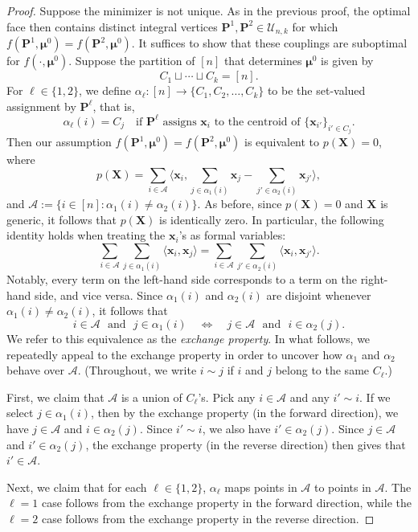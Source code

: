 \documentclass[10pt,a4paper]{amsart}
\newcommand{\bUnk}{\mathcal{U}_{n,k}}
\newcommand{\la}{\big\langle}
\newcommand{\ra}{\big\rangle}
\newcommand{\bmu}{\bm{\mu}}
\newcommand{\cA}{\mathcal{A}}
\theoremstyle{plain}
\theoremstyle{definition}
\begin{document}
\begin{proof}
Suppose the minimizer is not unique.  As in the previous proof, the optimal face then contains distinct integral vertices $\bm{P}^1,\bm{P}^2\in\bUnk$ for which $f(\bm{P}^1,\bmu^0)=f(\bm{P}^2,\bmu^0)$.  It suffices to show that these couplings are suboptimal for $f(\cdot,\bmu^0)$.
Suppose the partition of $[n]$ that determines $\bmu^0$ is given by 
\[
C_1\sqcup \cdots \sqcup C_k 
= [n].
\]
For $\ell\in \{1,2 \}$, we define $\alpha_\ell\colon [n]\to \{ C_1, C_2,\dotsc, C_k\}$ to be the set-valued assignment by $\bm{P}^\ell$, that is,
\[
\alpha_\ell(i) 
= C_j\quad \text{if $\bm{P}^\ell$ assigns $\bm{x}_i$ to the centroid of $\{\bm{x}_{i'}\}_{i'\in C_j}$}.
\] 
Then our assumption $f(\bm{P}^1,\bmu^0)=f(\bm{P}^2,\bmu^0)$ is equivalent to $p(\bm{X})=0$, where
\[
p(\bm{X}) 
= \sum_{i\in \cA} \la \bm{x}_i , \sum_{j\in \alpha_1(i)} \bm{x}_j - \sum_{j' \in \alpha_2(i) } \bm{x}_{j'}  \ra,
\]
and $\cA := \{ i\in [n]: \alpha_1(i) \neq \alpha_2(i)\}$.
As before, since $p(\bm{X})=0$ and $\bm{X}$ is generic, it follows that $p(\bm{X})$ is identically zero.
In particular, the following identity holds when treating the $\bm{x}_i$'s as formal variables:
\[
\sum_{i\in \cA}\sum_{j\in \alpha_1(i)} \la \bm{x}_i ,  \bm{x}_j \ra 
= \sum_{i\in \cA} \sum_{j' \in \alpha_2(i) } \la \bm{x}_i,\bm{x}_{j'}  \ra.
\]
Notably, every term on the left-hand side corresponds to a term on the right-hand side, and vice versa.
Since $\alpha_1(i)$ and $\alpha_2(i)$ are disjoint whenever $\alpha_1(i)\neq\alpha_2(i)$, it follows that
\[
\text{$i\in \cA$ ~and~ $j\in \alpha_1(i)$}
\quad
\Longleftrightarrow
\quad
\text{$j \in \cA$ ~and~ $i\in \alpha_2(j)$}.
\]
We refer to this equivalence as the \textit{exchange property}.
In what follows, we repeatedly appeal to the exchange property in order to uncover how $\alpha_1$ and $\alpha_2$ behave over $\cA$.
(Throughout, we write $i\sim j$ if $i$ and $j$ belong to the same $C_\ell$.)

First, we claim that $\cA$ is a union of $C_\ell$'s. 
Pick any $i\in\cA$ and any $i'\sim i$.
If we select $j\in\alpha_1(i)$, then by the exchange property (in the forward direction), we have $j\in\cA$ and $i\in\alpha_2(j)$.
Since $i'\sim i$, we also have $i'\in\alpha_2(j)$.
Since $j\in\cA$ and $i'\in\alpha_2(j)$, the exchange property (in the reverse direction) then gives that $i'\in\cA$.

Next, we claim that for each $\ell\in\{1,2\}$, $\alpha_\ell$ maps points in $\cA$ to points in $\cA$.
The $\ell=1$ case follows from the exchange property in the forward direction, while the $\ell=2$ case follows from the exchange property in the reverse direction.


\end{proof}
\end{document}
